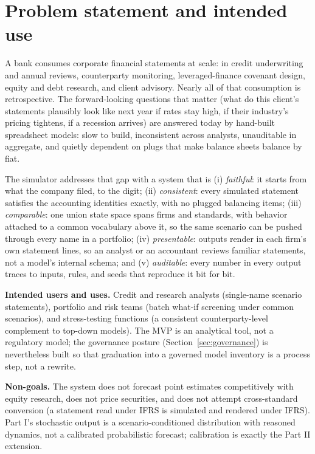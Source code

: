 \documentclass[11pt]{article}
\newcommand{\lead}[2]{\par\addvspace{5pt}\textbf{\textcolor{#1}{#2}}}
\begin{document}
\section{Problem statement and intended use}
\label{sec:problem}
A bank consumes corporate financial statements at scale: in credit underwriting and annual reviews, counterparty monitoring, leveraged-finance covenant design, equity and debt research, and client advisory. Nearly all of that consumption is retrospective. The forward-looking questions that matter (what do this client's statements plausibly look like next year if rates stay high, if their industry's pricing tightens, if a recession arrives) are answered today by hand-built spreadsheet models: slow to build, inconsistent across analysts, unauditable in aggregate, and quietly dependent on plugs that make balance sheets balance by fiat.

The simulator addresses that gap with a system that is (i) \emph{faithful}: it starts from what the company filed, to the digit; (ii) \emph{consistent}: every simulated statement satisfies the accounting identities exactly, with no plugged balancing items; (iii) \emph{comparable}: one union state space spans firms and standards, with behavior attached to a common vocabulary above it, so the same scenario can be pushed through every name in a portfolio; (iv) \emph{presentable}: outputs render in each firm's own statement lines, so an analyst or an accountant reviews familiar statements, not a model's internal schema; and (v) \emph{auditable}: every number in every output traces to inputs, rules, and seeds that reproduce it bit for bit.

\lead{navytwo}{Intended users and uses.} Credit and research analysts (single-name scenario statements), portfolio and risk teams (batch what-if screening under common scenarios), and stress-testing functions (a consistent counterparty-level complement to top-down models). The MVP is an analytical tool, not a regulatory model; the governance posture (Section~\ref{sec:governance}) is nevertheless built so that graduation into a governed model inventory is a process step, not a rewrite.

\lead{navytwo}{Non-goals.} The system does not forecast point estimates competitively with equity research, does not price securities, and does not attempt cross-standard conversion (a statement read under IFRS is simulated and rendered under IFRS). Part I's stochastic output is a scenario-conditioned distribution with reasoned dynamics, not a calibrated probabilistic forecast; calibration is exactly the Part II extension.
\end{document}
